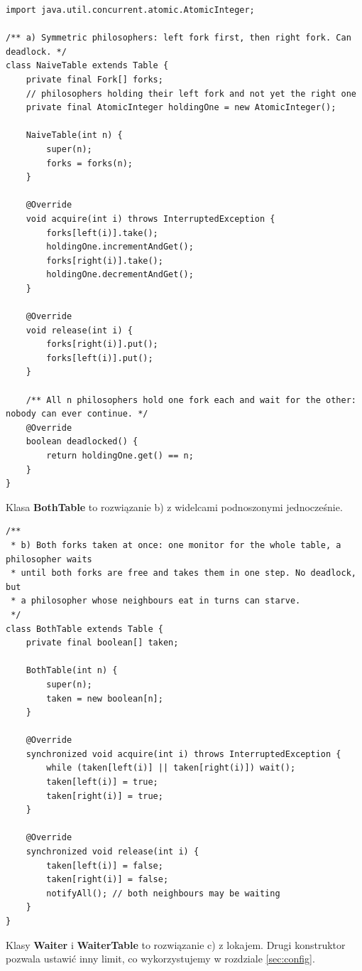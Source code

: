 \documentclass[11pt,a4paper]{article}
\begin{document}
\begin{lstlisting}[caption={Klasa \textbf{NaiveTable} (\texttt{src/NaiveTable.java})}]
import java.util.concurrent.atomic.AtomicInteger;

/** a) Symmetric philosophers: left fork first, then right fork. Can deadlock. */
class NaiveTable extends Table {
    private final Fork[] forks;
    // philosophers holding their left fork and not yet the right one
    private final AtomicInteger holdingOne = new AtomicInteger();

    NaiveTable(int n) {
        super(n);
        forks = forks(n);
    }

    @Override
    void acquire(int i) throws InterruptedException {
        forks[left(i)].take();
        holdingOne.incrementAndGet();
        forks[right(i)].take();
        holdingOne.decrementAndGet();
    }

    @Override
    void release(int i) {
        forks[right(i)].put();
        forks[left(i)].put();
    }

    /** All n philosophers hold one fork each and wait for the other: nobody can ever continue. */
    @Override
    boolean deadlocked() {
        return holdingOne.get() == n;
    }
}
\end{lstlisting}

Klasa \textbf{BothTable} to rozwiązanie b) z widelcami podnoszonymi jednocześnie.

\begin{lstlisting}[caption={Klasa \textbf{BothTable} (\texttt{src/BothTable.java})}]
/**
 * b) Both forks taken at once: one monitor for the whole table, a philosopher waits
 * until both forks are free and takes them in one step. No deadlock, but
 * a philosopher whose neighbours eat in turns can starve.
 */
class BothTable extends Table {
    private final boolean[] taken;

    BothTable(int n) {
        super(n);
        taken = new boolean[n];
    }

    @Override
    synchronized void acquire(int i) throws InterruptedException {
        while (taken[left(i)] || taken[right(i)]) wait();
        taken[left(i)] = true;
        taken[right(i)] = true;
    }

    @Override
    synchronized void release(int i) {
        taken[left(i)] = false;
        taken[right(i)] = false;
        notifyAll(); // both neighbours may be waiting
    }
}
\end{lstlisting}

Klasy \textbf{Waiter} i \textbf{WaiterTable} to rozwiązanie c) z lokajem. Drugi konstruktor pozwala ustawić inny limit, co wykorzystujemy w rozdziale \ref{sec:config}.
\end{document}
